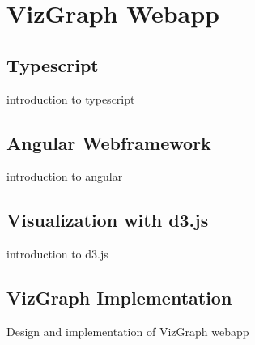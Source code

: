 \chapter{VizGraph Webapp}\label{sec:geoforms}


\section{Typescript}\label{sec:typescript}
introduction to typescript

\section{Angular Webframework}\label{sec:angular}
introduction to angular

\section{Visualization with d3.js}\label{sec:d3}
introduction to d3.js

\section{VizGraph Implementation}\label{sec:geoimpl}
Design and implementation of VizGraph webapp
